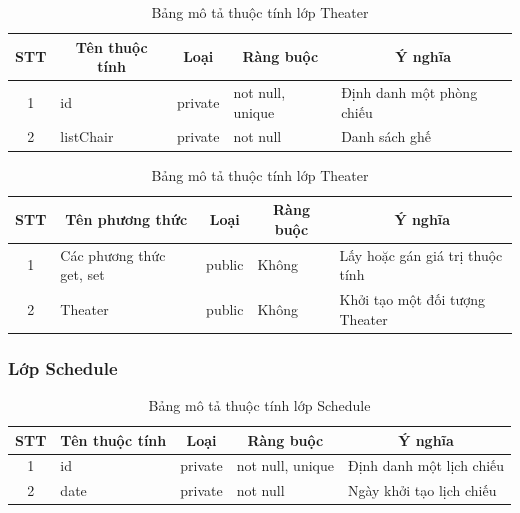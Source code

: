 \documentclass[a4paper, 12pt]{article}
\begin{document}
\begin{table}[H]
	\begin{center}
		\begin{tabular}{|c|l|c|l|l|}
			\hline
			STT & \multicolumn{1}{c|}{Tên thuộc tính} & Loại                         & \multicolumn{1}{c|}{Ràng buộc} & \multicolumn{1}{c|}{Ý nghĩa} \\ \hline
			1   & id                                  & private                      & not null, unique               & Định danh một phòng chiếu    \\ \hline
			2   & listChair                           & \multicolumn{1}{l|}{private} & not null                       & Danh sách ghế                \\ \hline
			\end{tabular}
			\caption{Bảng mô tả thuộc tính lớp Theater}
	\end{center}
\end{table}

\begin{table}[H]
	\begin{center}
		\begin{tabular}{|c|l|c|l|l|}
			\hline
			STT & \multicolumn{1}{c|}{Tên phương thức} & Loại                        & \multicolumn{1}{c|}{Ràng buộc} & \multicolumn{1}{c|}{Ý nghĩa}    \\ \hline
			1   & Các phương thức get, set             & public                      &              Không                  & Lấy hoặc gán giá trị thuộc tính \\ \hline
			2   & Theater                              & \multicolumn{1}{l|}{public} &                   Không             & Khởi tạo một đối tượng Theater  \\ \hline
			\end{tabular}
			\caption{Bảng mô tả thuộc tính lớp Theater}
	\end{center}
\end{table}

\subsubsection{Lớp Schedule}

\begin{table}[H]
	\begin{center}
		\begin{tabular}{|c|l|c|l|l|}
			\hline
			STT & \multicolumn{1}{c|}{Tên thuộc tính} & Loại                         & \multicolumn{1}{c|}{Ràng buộc} & \multicolumn{1}{c|}{Ý nghĩa} \\ \hline
			1   & id                                  & private                      & not null, unique               & Định danh một lịch chiếu     \\ \hline
			2   & date                                & \multicolumn{1}{l|}{private} & not null                       & Ngày khởi tạo lịch chiếu     \\ \hline
		\end{tabular}
		\caption{Bảng mô tả thuộc tính lớp Schedule}
	\end{center}
\end{table}
\end{document}
